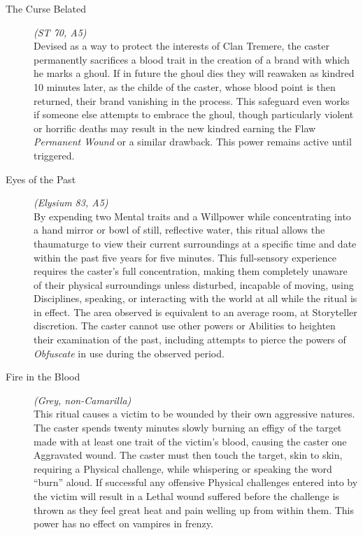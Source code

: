 \begin{description}
	\item[The Curse Belated] \emph{(ST 70, A5)} \hfill \\
	Devised as a way to protect the interests of Clan Tremere, the caster permanently sacrifices a blood trait in the creation 
	of a brand with which he marks a ghoul.  If in future the ghoul dies they will reawaken as kindred 10 minutes later, as the
	childe of the caster, whose blood point is then returned, their brand vanishing in the process.  This safeguard even works 
	if someone else attempts to embrace the ghoul, though particularly violent or horrific deaths may result in the new kindred 
	earning the Flaw \emph{Permanent Wound} or a similar drawback. This power remains active until triggered. \\
	
	\item[Eyes of the Past] \emph{(Elysium 83, A5)} \hfill \\
	By expending two Mental traits and a Willpower while concentrating into a hand mirror or bowl of still, reflective water, this 
	ritual allows the thaumaturge to view their current surroundings at a specific time and date within the past five years for five 
	minutes.  This full-sensory experience requires the caster's full concentration, making them completely unaware of their physical 
	surroundings unless disturbed, incapable of moving, using Disciplines, speaking, or interacting with the world at all while the 
	ritual is in effect.  The area observed is equivalent to an average room, at Storyteller discretion.  The caster cannot use other 
	powers or Abilities to heighten their examination of the past, including attempts to pierce the powers of \emph{Obfuscate} in use 
	during the observed period. \\

	\item[Fire in the Blood] \emph{(Grey, non-Camarilla)} \hfill \\
	This ritual causes a victim to be wounded by their own aggressive natures.  The caster spends twenty minutes slowly burning an 
	effigy of the target made with at least one trait of the victim's blood, causing the caster one Aggravated wound.  The caster 
	must then touch the target, skin to skin, requiring a Physical challenge, while whispering or speaking the word “burn” aloud.  
	If successful any offensive Physical challenges entered into by the victim will result in a Lethal wound suffered before the 
	challenge is thrown as they feel great heat and pain welling up from within them.  This power has no effect on vampires in 
	frenzy. \\


\end{description}
